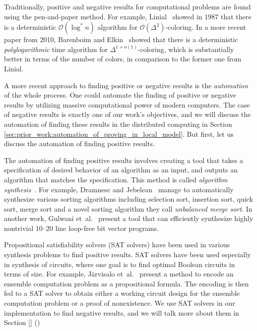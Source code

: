 Traditionally, positive and negative results for computational problems are found using the pen-and-paper method.
For example, Linial\ \cite{DBLP:conf/focs/Linial87} showed in 1987 that there is a deterministic \(\mathcal{O}(\log^* n)\) algorithm for \(\mathcal{O}(\Delta^2)\)-coloring.
In a more recent paper from 2010, Barenboim and Elkin\ \cite{DBLP:conf/podc/BarenboimE10} showed that there is a deterministic \emph{polylogarithmic} time algorithm for \(\Delta^{1 + o(1)}\)-coloring, which is substantially better in terms of the number of colors, in comparison to the former one \cite{DBLP:conf/focs/Linial87} from Linial.

A more recent approach to finding positive or negative results is the \emph{automation} of the whole process.
One could automate the finding of positive or negative results by utilizing massive computational power of modern computers.
The case of negative results is exactly one of our work's objectives, and we will discuss the automation of finding these results in the distributed computing in Section \ref{sec:prior_work:automation_of_proving_in_local_model}.
But first, let us discuss the automation of finding positive results.

The automation of finding positive results involves creating a tool that takes a specification of desired behavior of an algorithm as an input, and outputs an algorithm that matches the specification.
This method is called \emph{algorithm synthesis}~\cite{DBLP:phd/basesearch/Rybicki16}.
For example, Dramnesc and Jebelean\ \cite{DBLP:journals/jsc/DramnescJ15} manage to automatically synthesize various sorting algorithms including selection sort, insertion sort, quick sort, merge sort and a novel sorting algorithm they call \emph{unbalanced merge sort}.
In another work, Gulwani et~al.\ \cite{DBLP:conf/pldi/GulwaniJTV11} present a tool that can efficiently synthesize highly nontrivial 10--20 line loop-free bit vector programs.

Propositional satisfiability solvers (SAT solvers) have been used in various synthesis problems to find positive results.
SAT solvers have been used especially in synthesis of circuits, where one goal is to find optimal Boolean circuits in terms of size.
For example, Järvisalo et~al.\ \cite{DBLP:conf/sat/JarvisaloKKK12} present a method to encode an ensemble computation problem as a propositional formula.
The encoding is then fed to a SAT solver to obtain either a working circuit design for the ensemble computation problem or a proof of nonexistence.
We use SAT solvers in our implementation to find negative results, and we will talk more about them in Section \ref{} ()

